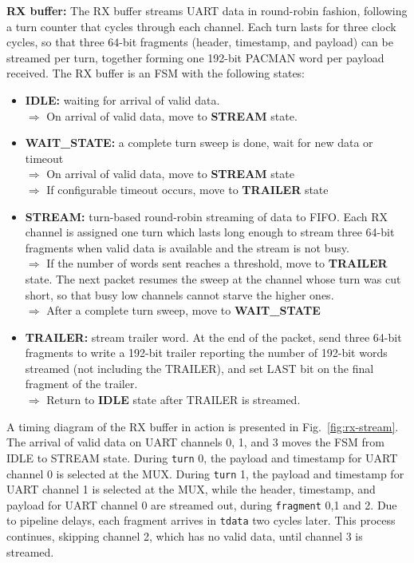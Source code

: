 \documentclass[12pt]{article}
\begin{document}
{\bf RX buffer:} The RX buffer streams UART data in round-robin
fashion, following a turn counter that cycles through each channel.
Each turn lasts for three clock cycles, so that three 64-bit fragments
(header, timestamp, and payload) can be streamed per turn, together forming one 192-bit
PACMAN word per payload received.  The RX buffer is an FSM with the
following states:
\begin{itemize}
  \item {\bf IDLE:}  waiting for arrival of valid data.\\
     $\Rightarrow$ On arrival of valid data, move to {\bf STREAM} state.

  \item {\bf WAIT\_STATE:} a complete turn sweep is done, wait for new data or timeout\\
     $\Rightarrow$ On arrival of valid data, move to {\bf STREAM} state\\
     $\Rightarrow$ If configurable timeout occurs, move to {\bf TRAILER} state

  \item {\bf STREAM:} turn-based round-robin streaming of data to FIFO. Each RX
     channel is assigned one turn which lasts long enough to stream
     three 64-bit fragments when valid data is available and the
     stream is not busy.\\
     $\Rightarrow$ If the number of words sent reaches a threshold, move to
     {\bf TRAILER} state.  The next packet resumes the sweep at the
     channel whose turn was cut short, so that busy low channels cannot
     starve the higher ones.\\
     $\Rightarrow$ After a complete turn sweep, move to {\bf WAIT\_STATE}

  \item {\bf TRAILER:} stream trailer word.
     At the end of the packet, send three 64-bit fragments to write a
     192-bit trailer reporting the number of 192-bit words streamed
     (not including the TRAILER), and set LAST bit on the final
     fragment of the trailer.\\
     $\Rightarrow$ Return to {\bf IDLE} state after TRAILER is streamed.
\end{itemize}
A timing diagram of the RX buffer in action is presented in
Fig.~\ref{fig:rx-stream}.  The arrival of valid data on UART channels
0, 1, and 3 moves the FSM from IDLE to STREAM state.  During {\tt turn}
0, the payload and timestamp for UART channel 0 is selected at the
MUX. During {\tt turn} 1, the payload and timestamp for UART channel 1 is
selected at the MUX, while the header, timestamp, and payload for UART channel 0
are streamed out, during {\tt fragment} 0,1 and 2.  Due to pipeline
delays, each fragment arrives in {\tt tdata} two cycles later.  This
process continues, skipping channel 2, which has no valid data, until
channel 3 is streamed.
\end{document}
